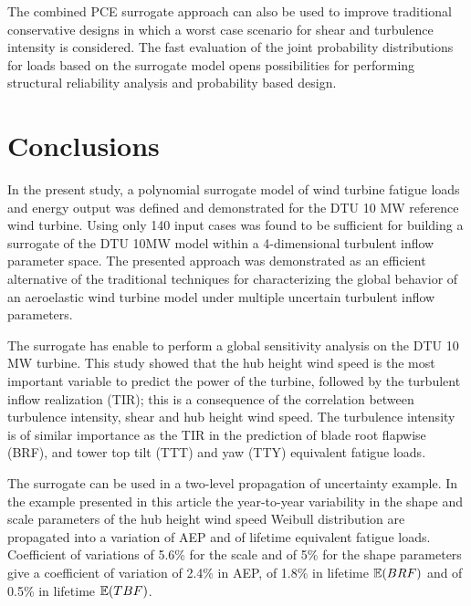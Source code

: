 \documentclass[preprint,12pt]{elsarticle}
\begin{document}
The combined PCE surrogate approach can also be used to improve traditional conservative designs in which a worst case scenario for shear and turbulence intensity is considered. The fast evaluation of the joint probability distributions for loads based on the surrogate model opens possibilities for performing structural reliability analysis and probability based design.

\section{Conclusions}

In the present study, a polynomial surrogate model of wind turbine fatigue loads and energy output was defined and demonstrated for the DTU 10 MW reference wind turbine. Using only 140 input cases was found to be sufficient for building a surrogate of the DTU 10MW model within a 4-dimensional turbulent inflow parameter space. The presented approach was demonstrated as an efficient alternative of the traditional techniques for characterizing the global behavior of an aeroelastic wind turbine model under multiple uncertain turbulent inflow parameters. 

The surrogate has enable to perform a global sensitivity analysis on the DTU 10 MW turbine. This study showed that the hub height wind speed is the most important variable to predict the power of the turbine, followed by the turbulent inflow realization (TIR); this is a consequence of the correlation between turbulence intensity, shear and hub height wind speed. The turbulence intensity is of similar  importance as the TIR in the prediction of blade root flapwise  (BRF), and tower top tilt (TTT) and yaw (TTY) equivalent fatigue loads. 

The surrogate can be used in a two-level propagation of uncertainty example. In the example presented in this article the year-to-year variability in the shape and scale parameters of the hub height wind speed Weibull distribution are propagated into a variation of AEP and of lifetime equivalent fatigue loads.  Coefficient of variations of 5.6\% for the scale and of 5\% for the shape parameters give a coefficient of variation of 2.4\% in AEP, of 1.8\% in lifetime $\mathbb{E}(BRF)$ and of 0.5\% in lifetime $\mathbb{E}(TBF)$. 

 
\end{document}
